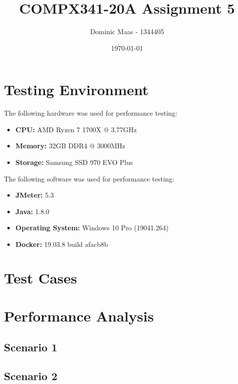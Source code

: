 \documentclass[a4paper]{report}
\begin{document}
\title{COMPX341-20A Assignment 5}
\author{Dominic Maas - 1344405}
\date{\today}

\maketitle

\tableofcontents

\chapter{Testing Environment}

The following hardware was used for performance testing:

\begin{itemize}
    \item \textbf{CPU:} AMD Ryzen 7 1700X @ 3.77GHz
    \item \textbf{Memory:} 32GB DDR4 @ 3000MHz
    \item \textbf{Storage:} Samsung SSD 970 EVO Plus
\end{itemize}

The following software was used for performance testing:

\begin{itemize}
    \item \textbf{JMeter:} 5.3
    \item \textbf{Java:} 1.8.0
    \item \textbf{Operating System:} Windows 10 Pro (19041.264)
    \item \textbf{Docker:} 19.03.8 build afacb8b
\end{itemize}

\chapter{Test Cases}
\lipsum[3]

\chapter{Performance Analysis}

\section{Scenario 1}
\lipsum[3]

\section{Scenario 2}
\lipsum[3]
\end{document}
